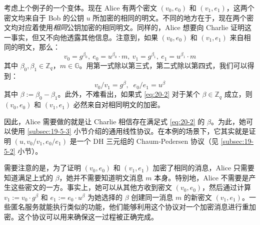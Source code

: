 \begin{example}[明文相等2]
考虑上个例子的一个变体。现在 Alice 有两个密文 $(v_0,e_0)$ 和 $(v_1,e_1)$，这两个密文均来自于 Bob 的公钥 $u$ 所加密的相同的明文。不同的地方在于，现在两个密文均对应着使用\emph{相同}公钥加密的相同明文。同样的，Alice 想要向 Charlie 证明这一事实，但又不向他透露其他信息。注意到，如果 $(v_0,e_0)$ 和 $(v_1,e_1)$ 来自相同的明文，那么：
$$
v_0 =g^{\beta_0},\ 
e_0 =u^{\beta_0}·m,\ 
v_1 =g^{\beta_1},\ 
e_1 =u^{\beta_1}·m
$$
其中 $\beta_0,\beta_1\in\mathbb{Z}_q$，$m\in\mathbb{G}$。用第一式除以第三式，第二式除以第四式，我们可以得到：
\begin{equation}\label{eq:20-2}
{v_0}/{v_1}=g^\beta,\;\;
{e_0}/{e_1}=u^\beta
\end{equation}
其中 $\beta:=\beta_0-\beta_1$。此外，不难看出，如果式 \ref{eq:20-2} 对于某个 $\beta\in\mathbb{Z}_q$ 成立，则 $(v_0,e_0)$ 和 $(v_1,e_1)$ 必然来自对相同明文的加密。

因此，Alice 需要做的就是让 Charlie 相信存在满足式 \ref{eq:20-2} 的 $\beta$。为此，她可以使用 \ref{subsec:19-5-3} 小节介绍的通用线性协议。在本例的场景下，它其实就是证明 $(u,{v_0}/{v_1},{e_0}/{e_1})$ 是一个 DH 三元组的 Chaum-Pedersen 协议（见 \ref{subsec:19-5-2} 小节）。

需要注意的是，为了证明 $(v_0,e_0)$ 和 $(v_1,e_1)$ 加密了相同的消息，Alice 只需要知道满足上式的 $\beta$，她并不需要知道明文消息 $m$ 本身。特别地，Alice 不需要是产生这些密文的一方。事实上，她可以从其他方收到密文 $(v_0,e_0)$，然后通过计算 $v_1:=v_0\cdot g^\beta$ 和 $e_1:=e_0\cdot u^\beta$ 为她选择的 $\beta$ 创建同一消息 $m$ 的新密文 $(v_1,e_1)$。一些匿名服务就能执行类似的功能，他们能够利用这个协议对一个加密消息进行重加密。这个协议可以用来确保这一过程被正确完成。
\end{example}

